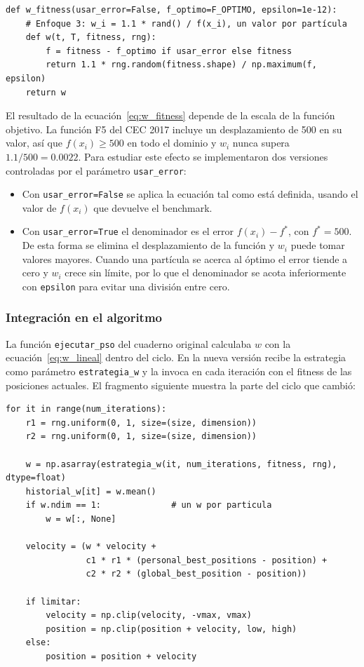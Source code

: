 \begin{lstlisting}[emph={w_fitness, w}, caption={Función de peso por partícula}]
def w_fitness(usar_error=False, f_optimo=F_OPTIMO, epsilon=1e-12):
    # Enfoque 3: w_i = 1.1 * rand() / f(x_i), un valor por partícula
    def w(t, T, fitness, rng):
        f = fitness - f_optimo if usar_error else fitness
        return 1.1 * rng.random(fitness.shape) / np.maximum(f, epsilon)
    return w
\end{lstlisting}

El resultado de la ecuación~\eqref{eq:w_fitness} depende de la escala de la función objetivo. La función F5 del CEC 2017 incluye un desplazamiento de 500 en su valor, así que $f(x_i) \geq 500$ en todo el dominio y $w_i$ nunca supera $1.1/500 = 0.0022$. Para estudiar este efecto se implementaron dos versiones controladas por el parámetro \texttt{usar\_error}:

\begin{itemize}
\item Con \texttt{usar\_error=False} se aplica la ecuación tal como está definida, usando el valor de $f(x_i)$ que devuelve el benchmark.
\item Con \texttt{usar\_error=True} el denominador es el error $f(x_i) - f^*$, con $f^* = 500$. De esta forma se elimina el desplazamiento de la función y $w_i$ puede tomar valores mayores. Cuando una partícula se acerca al óptimo el error tiende a cero y $w_i$ crece sin límite, por lo que el denominador se acota inferiormente con \texttt{epsilon} para evitar una división entre cero.
\end{itemize}

\subsubsection{Integración en el algoritmo}

La función \texttt{ejecutar\_pso} del cuaderno original calculaba $w$ con la ecuación~\eqref{eq:w_lineal} dentro del ciclo. En la nueva versión recibe la estrategia como parámetro \texttt{estrategia\_w} y la invoca en cada iteración con el fitness de las posiciones actuales. El fragmento siguiente muestra la parte del ciclo que cambió:

\begin{lstlisting}[emph={estrategia_w, w}, caption={Cálculo de $w$ y actualización de velocidad dentro de \texttt{ejecutar\_pso}}]
for it in range(num_iterations):
    r1 = rng.uniform(0, 1, size=(size, dimension))
    r2 = rng.uniform(0, 1, size=(size, dimension))

    w = np.asarray(estrategia_w(it, num_iterations, fitness, rng), dtype=float)
    historial_w[it] = w.mean()
    if w.ndim == 1:              # un w por particula
        w = w[:, None]

    velocity = (w * velocity +
                c1 * r1 * (personal_best_positions - position) +
                c2 * r2 * (global_best_position - position))

    if limitar:
        velocity = np.clip(velocity, -vmax, vmax)
        position = np.clip(position + velocity, low, high)
    else:
        position = position + velocity
\end{lstlisting}

